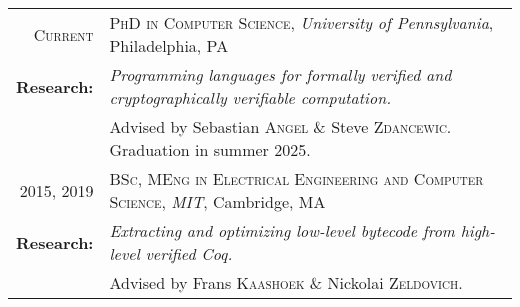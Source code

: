 \begin{tabular}{rl}
\textsc{Current}   & \textsc{PhD in Computer Science}, \emph{University of Pennsylvania}, Philadelphia, PA\\
\textbf{Research:} & \emph{Programming languages for formally verified and cryptographically verifiable computation.} \\
                   & Advised by Sebastian \textsc{Angel} \& Steve \textsc{Zdancewic}. Graduation in summer 2025. \\[0.5em]
2015, 2019         & \textsc{BSc, MEng in Electrical Engineering and Computer Science}, \emph{MIT}, Cambridge, MA\\
\textbf{Research:} & \emph{Extracting and optimizing low-level bytecode from high-level verified Coq.}\\
    & Advised by Frans \textsc{Kaashoek} \& Nickolai \textsc{Zeldovich}.
\end{tabular}

